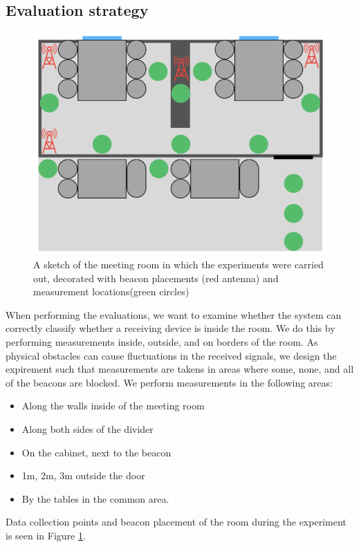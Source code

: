 \subsection{Evaluation strategy}
\begin{figure}[h]
    \centering
    \includegraphics[scale=0.7]{images/experiment_setup.png}
    \caption{A sketch of the meeting room in which the experiments were carried out, decorated with beacon placements (red antenna) and measurement locations(green circles)}
    \label{fig:experiment_setup}
\end{figure}
When performing the evaluations, we want to examine whether the system can correctly classify whether a receiving device is inside the room.
We do this by performing measurements inside, outside, and on borders of the room.
As physical obstacles can cause fluctuations in the received signals, we design the expirement such that measurements are takens in areas where some, none, and all of the beacons are blocked. 
We perform measurements in the following areas:
\begin{itemize}
    \item Along the walls inside of the meeting room
    \item Along both sides of the divider
    \item On the cabinet, next to the beacon
    \item 1m, 2m, 3m outside the door
    \item By the tables in the common area. 
\end{itemize}
Data collection points and beacon placement of the room during the experiment is seen in Figure \ref{fig:experiment_setup}.
